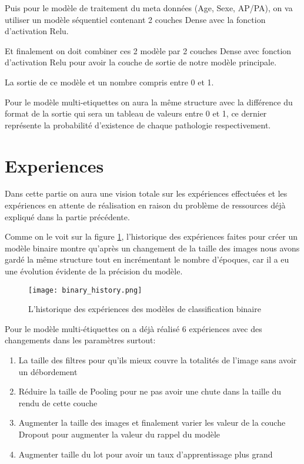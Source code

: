 Puis pour le modèle de traitement du meta données (Age, Sexe, AP/PA), on va utiliser un modèle séquentiel contenant 2 couches Dense avec la fonction d’activation Relu.

Et finalement on doit combiner ces 2 modèle par 2 couches Dense avec fonction d’activation Relu pour avoir la couche de sortie de notre modèle principale.

La sortie de ce modèle et un nombre compris entre 0 et 1.

Pour le modèle multi-etiquettes on aura la même structure avec la différence du format de la sortie qui sera un tableau de valeurs entre 0 et 1, ce dernier représente la probabilité d'existence de chaque pathologie respectivement.


\section{Experiences}

Dans cette partie on aura une vision totale sur les expériences effectuées et les expériences en attente de réalisation en raison du problème de ressources déjà expliqué dans la partie précédente.

Comme on le voit sur la figure \ref{fig:binary_history}, l'historique des expériences faites pour créer un modèle binaire montre qu’après un changement de la taille des images nous avons gardé la même structure tout en incrémentant le nombre d'époques, car il a eu une évolution évidente de la précision du modèle.

\begin{figure}[H]
    \centering
    \texttt{[image: binary\_history.png]}
    \caption{L’historique des expériences des modèles de classification binaire}\label{fig:binary_history}
\end{figure}

Pour le modèle multi-étiquettes on a déjà réalisé 6 expériences avec des changements dans les paramètres surtout:
\begin{enumerate}
    \item La taille des filtres pour qu’ils mieux couvre la totalités de l’image sans avoir un débordement
    \item Réduire la taille de Pooling pour ne pas avoir une chute dans la taille du rendu de cette couche
    \item Augmenter la taille des images et finalement varier les valeur de la couche Dropout pour augmenter la valeur du rappel du modèle
    \item Augmenter taille du lot pour avoir un taux d'apprentissage plus grand
\end{enumerate}

